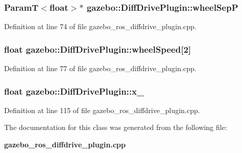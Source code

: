 \subsubsection[{wheelSepP}]{\setlength{\rightskip}{0pt plus 5cm}ParamT$<$float$>$$\ast$ {\bf gazebo::DiffDrivePlugin::wheelSepP}\hspace{0.3cm}{\ttfamily  [private]}}\label{classgazebo_1_1DiffDrivePlugin_adb819234190b3cb5a95d3c408bf73633}


Definition at line 74 of file gazebo\_\-ros\_\-diffdrive\_\-plugin.cpp.

\subsubsection[{wheelSpeed}]{\setlength{\rightskip}{0pt plus 5cm}float {\bf gazebo::DiffDrivePlugin::wheelSpeed}[2]\hspace{0.3cm}{\ttfamily  [private]}}\label{classgazebo_1_1DiffDrivePlugin_a2d1454931ce7c70633aa0773d8cbf3b3}


Definition at line 77 of file gazebo\_\-ros\_\-diffdrive\_\-plugin.cpp.

\subsubsection[{x\_\-}]{\setlength{\rightskip}{0pt plus 5cm}float {\bf gazebo::DiffDrivePlugin::x\_\-}\hspace{0.3cm}{\ttfamily  [private]}}\label{classgazebo_1_1DiffDrivePlugin_afc221c51ce76ba4d6e419047323b4e25}


Definition at line 115 of file gazebo\_\-ros\_\-diffdrive\_\-plugin.cpp.



The documentation for this class was generated from the following file:\begin{DoxyCompactItemize}
\item 
{\bf gazebo\_\-ros\_\-diffdrive\_\-plugin.cpp}\end{DoxyCompactItemize}
